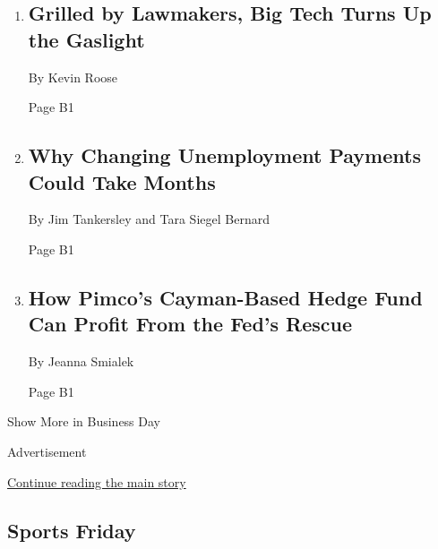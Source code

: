 \begin{enumerate}
\def\labelenumi{\arabic{enumi}.}
\item
  \href{/2020/07/30/technology/big-tech-ceos.html}{}

  \hypertarget{grilled-by-lawmakers-big-tech-turns-up-the-gaslight-1}{%
  \subsection{Grilled by Lawmakers, Big Tech Turns Up the
  Gaslight}\label{grilled-by-lawmakers-big-tech-turns-up-the-gaslight-1}}

  By Kevin Roose

  Page B1
\item
  \href{/2020/07/30/business/unemployment-payments-change.html}{}

  \hypertarget{why-changing-unemployment-payments-could-take-months}{%
  \subsection{Why Changing Unemployment Payments Could Take
  Months}\label{why-changing-unemployment-payments-could-take-months}}

  By Jim Tankersley and Tara Siegel Bernard

  Page B1
\item
  \href{/2020/07/30/business/economy/fed-talf-wall-street.html}{}

  \hypertarget{how-pimcos-cayman-based-hedge-fund-can-profit-from-the-feds-rescue-1}{%
  \subsection{How Pimco's Cayman-Based Hedge Fund Can Profit From the
  Fed's
  Rescue}\label{how-pimcos-cayman-based-hedge-fund-can-profit-from-the-feds-rescue-1}}

  By Jeanna Smialek

  Page B1
\end{enumerate}

Show More in Business Day

Advertisement

\protect\hyperlink{after-mid4}{Continue reading the main story}

\hypertarget{sports-friday}{%
\subsection{Sports Friday}\label{sports-friday}}

